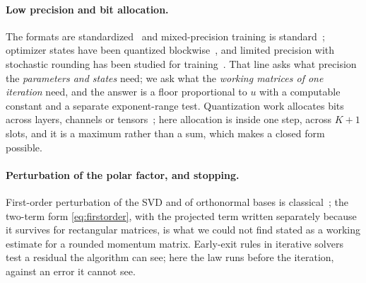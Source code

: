 \paragraph{Low precision and bit allocation.}
The formats are standardized~\cite{micikevicius2022fp8} and mixed-precision training is
standard~\cite{micikevicius2018mixed}; optimizer states have been quantized
blockwise~\cite{dettmers2022optimizers}, and limited precision with stochastic rounding
has been studied for training~\cite{gupta2015limited}.  That line asks what precision the \emph{parameters and states} need; we ask what the
\emph{working matrices of one iteration} need, and the answer is a floor proportional to $u$
with a computable constant and a separate exponent-range test.  Quantization work
allocates bits across layers, channels or tensors~\cite{hariri2025quantize,dettmers2022optimizers};
here allocation is inside one step, across $K+1$ slots, and it is a maximum rather than a
sum, which makes a closed form possible.

\paragraph{Perturbation of the polar factor, and stopping.}
First-order perturbation of the SVD and of orthonormal bases is
classical~\cite{stewart1990perturbation,golub2013matrix}; the two-term form
\eqref{eq:firstorder}, with the projected term written separately because it survives for
rectangular matrices, is what we could not find stated as a working estimate for a
rounded momentum matrix.  Early-exit rules in iterative solvers test a residual the algorithm can see; here the law
runs before the iteration, against an error it cannot see.
